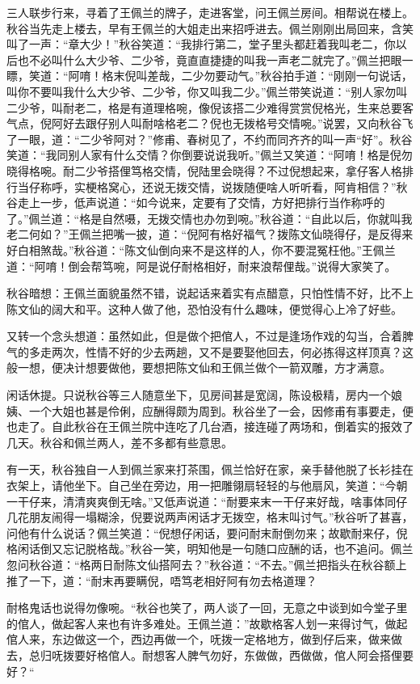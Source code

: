 \documentclass[12pt,UTF8]{ctexbook}
\begin{document}
{{{三人联步行来，寻着了王佩兰的牌子，走进客堂，问王佩兰房间。相帮说在楼上。秋谷当先走上楼去，早有王佩兰的大姐走出来招呼进去。佩兰刚刚出局回来，含笑叫了一声：“章大少！”秋谷笑道：“我排行第二，堂子里头都赶着我叫老二，你以后也不必叫什么大少爷、二少爷，竟直直捷捷的叫我一声老二就完了。”佩兰把眼一瞟，笑道：“阿唷！格末倪叫差哉，二少勿要动气。”秋谷拍手道：“刚刚一句说话，叫你不要叫我什么大少爷、二少爷，你又叫我二少。”佩兰带笑说道：“别人家勿叫二少爷，叫耐老二，格是有道理格啘，像倪该搭二少难得赏赏倪格光，生来总要客气点，倪阿好去跟仔别人叫耐啥格老二？倪也无拨格号交情啘。”说罢，又向秋谷飞了一眼，道：“二少爷阿对？”修甫、春树见了，不约而同齐齐的叫一声“好”。秋谷笑道：“我同别人家有什么交情？你倒要说说我听。”佩兰又笑道：“阿唷！格是倪勿晓得格啘。耐二少爷搭俚笃格交情，倪陆里会晓得？不过倪想起来，拿仔客人格排行当仔称呼，实梗格窝心，还说无拨交情，说拨随便啥人听听看，阿肯相信？”秋谷走上一步，低声说道：“如今说来，定要有了交情，方好把排行当作称呼的了。”佩兰道：“格是自然嗫，无拨交情也办勿到啘。”秋谷道：“自此以后，你就叫我老二何如？”王佩兰把嘴一披，道：“倪阿有格好福气？拨陈文仙晓得仔，是反得来好白相煞哉。”秋谷道：“陈文仙倒向来不是这样的人，你不要混冤枉他。”王佩兰道：“阿唷！倒会帮笃啘，阿是说仔耐格相好，耐来浪帮俚哉。”说得大家笑了。

秋谷暗想：王佩兰面貌虽然不错，说起话来着实有点醋意，只怕性情不好，比不上陈文仙的阔大和平。这种人做了他，恐怕没有什么趣味，便觉得心上冷了好些。

又转一个念头想道：虽然如此，但是做个把倌人，不过是逢场作戏的勾当，合着脾气的多走两次，性情不好的少去两趟，又不是要娶他回去，何必拣得这样顶真？这般一想，便决计想要做他，要想把陈文仙和王佩兰做个一箭双雕，方才满意。

闲话休提。只说秋谷等三人随意坐下，见房间甚是宽阔，陈设极精，房内一个娘姨、一个大姐也甚是伶俐，应酬得颇为周到。秋谷坐了一会，因修甫有事要走，便也走了。自此秋谷在王佩兰院中连吃了几台酒，接连碰了两场和，倒着实的报效了几天。秋谷和佩兰两人，差不多都有些意思。

有一天，秋谷独自一人到佩兰家来打茶围，佩兰恰好在家，亲手替他脱了长衫挂在衣架上，请他坐下。自己坐在旁边，用一把雕翎扇轻轻的与他扇风，笑道：“今朝一干仔来，清清爽爽倒无啥。”又低声说道：“耐要来末一干仔来好哉，啥事体同仔几花朋友闹得一塌糊涂，倪要说两声闲话才无拨空，格末叫讨气。”秋谷听了甚喜，问他有什么说话？佩兰笑道：“倪想仔闲话，要问耐末耐倒勿来；故歇耐来仔，倪格闲话倒又忘记脱格哉。”秋谷一笑，明知他是一句随口应酬的话，也不追问。佩兰忽问秋谷道：“格两日耐陈文仙搭阿去？”秋谷道：“不去。”佩兰把指头在秋谷额上推了一下，道：“耐末再要瞒倪，唔笃老相好阿有勿去格道理？

耐格鬼话也说得勿像啘。“秋谷也笑了，两人谈了一回，无意之中谈到如今堂子里的倌人，做起客人来也有许多难处。王佩兰道：”故歇格客人划一来得讨气，做起倌人来，东边做这一个，西边再做一个，呒拨一定格地方，做到仔后来，做来做去，总归呒拨要好格倌人。耐想客人脾气勿好，东做做，西做做，倌人阿会搭俚要好？“

}}}
\end{document}
